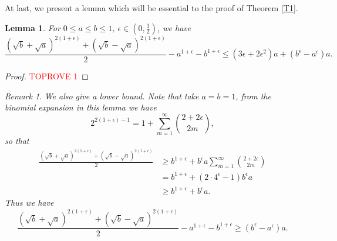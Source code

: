 \documentclass[10pt]{article} \usepackage[utf8]{inputenc}
\newtheorem{lem}{Lemma}[section]
\theoremstyle{definition}
\theoremstyle{remark}
\newtheorem{rem}{Remark}[section]
\numberwithin{equation}{section}
\begin{document}
At last, we present a lemma which will be essential to the proof of Theorem \ref{T1}.
\begin{lem}
\label{L24}
For $0 \leq a \leq b \leq 1$, $\epsilon \in (0,\frac{1}{2})$, we have
\begin{equation}
\frac{(\sqrt{b}+\sqrt{a})^{2(1+\epsilon)}+(\sqrt{b}-\sqrt{a})^{2(1+\epsilon)}}{2}-a^{1+\epsilon}-b^{1+\epsilon} \leq (3\epsilon +2\epsilon^2)a + (b^\epsilon-a^\epsilon)a.
\end{equation}
\end{lem}
\begin{proof}\textcolor{red}{TOPROVE 1}\end{proof} 
\begin{rem}
\emph{
We also give a lower bound. Note that take $a=b=1$, from the binomial expansion in this lemma we have 
$$2^{2(1+\epsilon)-1}= 1+\sum\limits_{m=1}^{\infty}\binom{2+2\epsilon}{2m},$$
so that 
\begin{equation}
\begin{aligned}
\frac{(\sqrt{b}+\sqrt{a})^{2(1+\epsilon)}+(\sqrt{b}-\sqrt{a})^{2(1+\epsilon)}}{2} &\geq b^{1+\epsilon}+ b^{\epsilon}a\sum\limits_{m=1}^{\infty}\binom{2+2\epsilon}{2m}\\
&= b^{1+\epsilon}+(2\cdot 4^\epsilon -1)b^{\epsilon}a\\
&\geq b^{1+\epsilon}+b^{\epsilon}a.
\end{aligned}
\end{equation}
Thus we have 
\begin{equation}
\label{2.7}
\frac{(\sqrt{b}+\sqrt{a})^{2(1+\epsilon)}+(\sqrt{b}-\sqrt{a})^{2(1+\epsilon)}}{2}-a^{1+\epsilon}-b^{1+\epsilon} \geq (b^\epsilon-a^\epsilon)a.
\end{equation}
}
\end{rem}
\end{document}
